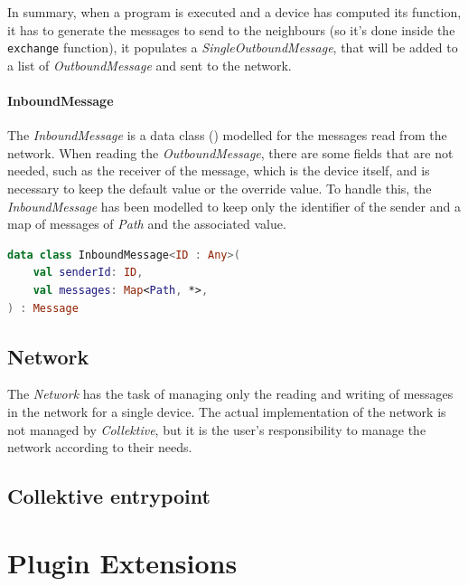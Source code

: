 In summary, when a program is executed and a device has computed its function, it has to generate the messages to send to
the neighbours (so it's done inside the \texttt{exchange} function), it populates a \emph{SingleOutboundMessage},
that will be added to a list of \emph{OutboundMessage} and sent to the network.

\paragraph{InboundMessage}
The \emph{InboundMessage} is a data class () modelled for the messages read from the network.
When reading the \emph{OutboundMessage}, there are some fields that are not needed, such as the receiver of the message,
which is the device itself, and is necessary to keep the default value or the override value.
To handle this, the \emph{InboundMessage} has been modelled to keep only the identifier of the sender and
a map of messages of \emph{Path} and the associated value.

\begin{lstlisting}[language=kt,label={lst:inbound}, caption={Inbound message data class.}]
data class InboundMessage<ID : Any>(
    val senderId: ID,
    val messages: Map<Path, *>,
) : Message
\end{lstlisting}

\subsection{Network}
\label{subsec:network}
The \emph{Network} has the task of managing only the reading and writing of messages in the network for a single device.
The actual implementation of the network is not managed by \emph{Collektive}, but it is the user's responsibility to manage
the network according to their needs.

\subsection{Collektive entrypoint}
\label{subsec:collektive-entrypoint}


\section{Plugin Extensions}
\label{sec:plugin-extensions}

